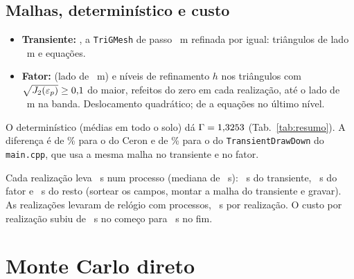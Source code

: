 \documentclass[11pt,a4paper]{article}
\begin{document}
\subsection{Malhas, determinístico e custo}
\begin{itemize}
\item \textbf{Transiente:} \texttt{\MalhaT}, a \texttt{TriGMesh} de passo \PassoMalha~m refinada por igual:
\TriTrans{} triângulos de lado \LadoTrans~m e \EqTrans{} equações.
\item \textbf{Fator:} \texttt{\MalhaF} (lado de \LadoFator~m) e \Nref{} níveis de refinamento $h$ nos triângulos com
$\sqrt{J_2(\varepsilon_p)} \geq 0{,}1$ do maior, refeitos do zero em cada realização, até o lado de
\LadoBanda~m na banda. Deslocamento quadrático; de \EqFatorMin{} a \EqFatorMax{} equações no último nível.
\end{itemize}
O determinístico (médias em todo o solo) dá $\Gamma = 1{,}3253$ (Tab.~\ref{tab:resumo}). A diferença é de
\DifDetCeron\% para o \GammaCeron{} do Ceron e de \DifDetMain\% para o \GammaMain{} do \texttt{TransientDrawDown} do
\texttt{main.cpp}, que usa a mesma malha no transiente e no fator.

Cada realização leva \CustoReal~s num processo (mediana de \CustoMediana~s): \CustoTrans~s do transiente,
\CustoFator~s do fator e \CustoResto~s do resto (sortear os campos, montar a malha do transiente e gravar). As
\NDireto{} realizações levaram \RelogioDireto{} de relógio com \ProcPC{} processos, \RelogioPorReal~s por realização. O
custo por realização subiu de \CustoPrimeiras~s no começo para \CustoUltimas~s no fim.

\section{Monte Carlo direto}\label{sec:direto}
\end{document}
